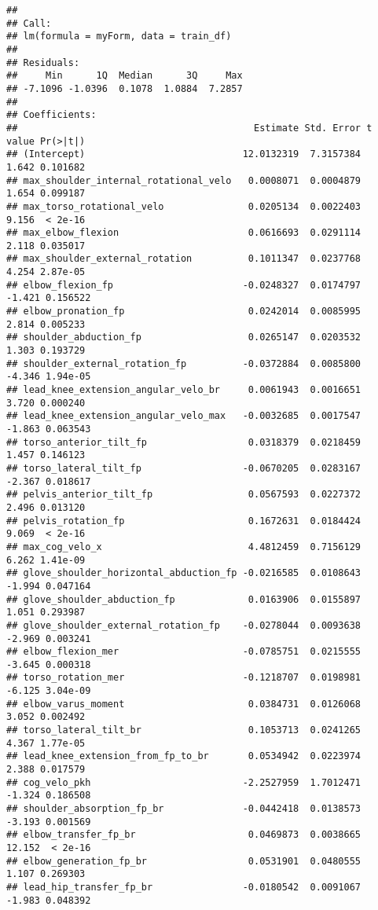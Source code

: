 \documentclass[
]{article}
\begin{document}
\begin{verbatim}
## 
## Call:
## lm(formula = myForm, data = train_df)
## 
## Residuals:
##     Min      1Q  Median      3Q     Max 
## -7.1096 -1.0396  0.1078  1.0884  7.2857 
## 
## Coefficients:
##                                          Estimate Std. Error t value Pr(>|t|)
## (Intercept)                            12.0132319  7.3157384   1.642 0.101682
## max_shoulder_internal_rotational_velo   0.0008071  0.0004879   1.654 0.099187
## max_torso_rotational_velo               0.0205134  0.0022403   9.156  < 2e-16
## max_elbow_flexion                       0.0616693  0.0291114   2.118 0.035017
## max_shoulder_external_rotation          0.1011347  0.0237768   4.254 2.87e-05
## elbow_flexion_fp                       -0.0248327  0.0174797  -1.421 0.156522
## elbow_pronation_fp                      0.0242014  0.0085995   2.814 0.005233
## shoulder_abduction_fp                   0.0265147  0.0203532   1.303 0.193729
## shoulder_external_rotation_fp          -0.0372884  0.0085800  -4.346 1.94e-05
## lead_knee_extension_angular_velo_br     0.0061943  0.0016651   3.720 0.000240
## lead_knee_extension_angular_velo_max   -0.0032685  0.0017547  -1.863 0.063543
## torso_anterior_tilt_fp                  0.0318379  0.0218459   1.457 0.146123
## torso_lateral_tilt_fp                  -0.0670205  0.0283167  -2.367 0.018617
## pelvis_anterior_tilt_fp                 0.0567593  0.0227372   2.496 0.013120
## pelvis_rotation_fp                      0.1672631  0.0184424   9.069  < 2e-16
## max_cog_velo_x                          4.4812459  0.7156129   6.262 1.41e-09
## glove_shoulder_horizontal_abduction_fp -0.0216585  0.0108643  -1.994 0.047164
## glove_shoulder_abduction_fp             0.0163906  0.0155897   1.051 0.293987
## glove_shoulder_external_rotation_fp    -0.0278044  0.0093638  -2.969 0.003241
## elbow_flexion_mer                      -0.0785751  0.0215555  -3.645 0.000318
## torso_rotation_mer                     -0.1218707  0.0198981  -6.125 3.04e-09
## elbow_varus_moment                      0.0384731  0.0126068   3.052 0.002492
## torso_lateral_tilt_br                   0.1053713  0.0241265   4.367 1.77e-05
## lead_knee_extension_from_fp_to_br       0.0534942  0.0223974   2.388 0.017579
## cog_velo_pkh                           -2.2527959  1.7012471  -1.324 0.186508
## shoulder_absorption_fp_br              -0.0442418  0.0138573  -3.193 0.001569
## elbow_transfer_fp_br                    0.0469873  0.0038665  12.152  < 2e-16
## elbow_generation_fp_br                  0.0531901  0.0480555   1.107 0.269303
## lead_hip_transfer_fp_br                -0.0180542  0.0091067  -1.983 0.048392

\end{verbatim}
\end{document}
